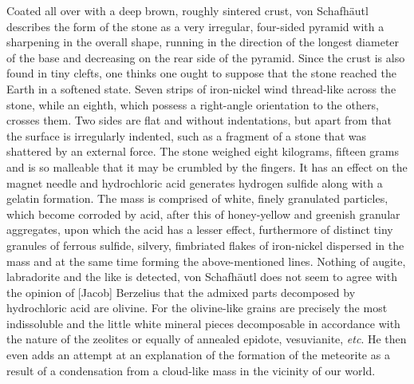 \documentclass[a4paper, 12pt, oneside]{article}
\begin{document}
Coated all over with a deep brown, roughly sintered crust, von Schafhäutl describes the form of the stone as a very irregular, four-sided pyramid with a sharpening in the overall shape, running in the direction of the longest diameter of the base and decreasing on the rear side of the pyramid. Since the crust is also found in tiny clefts, one thinks one ought to suppose that the stone reached the Earth in a softened state. Seven strips of iron-nickel wind thread-like across the stone, while an eighth, which possess a right-angle orientation to the others, crosses them. Two sides are flat and without indentations, but apart from that the surface is irregularly indented, such as a fragment of a stone that was shattered by an external force. The stone weighed eight kilograms, fifteen grams and is so malleable that it may be crumbled by the fingers. It has an effect on the magnet needle and hydrochloric acid generates hydrogen sulfide along with a gelatin formation. The mass is comprised of white, finely granulated particles, which become corroded by acid, after this of honey-yellow and greenish granular aggregates, upon which the acid has a lesser effect, furthermore of distinct tiny granules of ferrous sulfide, silvery, fimbriated flakes of iron-nickel dispersed in the mass and at the same time forming the above-mentioned lines. Nothing of augite, labradorite and the like is detected, von Schafhäutl does not seem to agree with the opinion of [Jacob] Berzelius that the admixed parts decomposed by hydrochloric acid are olivine. For the olivine-like grains are precisely the most indissoluble and the little white mineral pieces decomposable in accordance with the nature of the zeolites or equally of annealed epidote, vesuvianite, \emph{etc}. He then even adds an attempt at an explanation of the formation of the meteorite as a result of a condensation from a cloud-like mass in the vicinity of our world.
\end{document}
